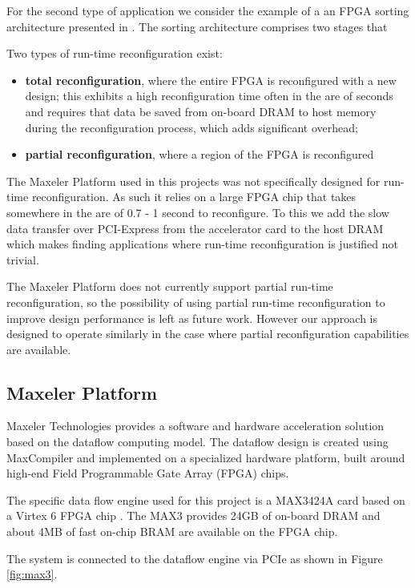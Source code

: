 For the second type of application we consider the example of a an
FPGA sorting architecture presented in \cite{koch2011fpgasort}. The
sorting architecture comprises two stages that

Two types of run-time reconfiguration exist:
\begin{itemize}
\item \textbf{total reconfiguration}, where the entire FPGA is
  reconfigured with a new design; this exhibits a high reconfiguration
  time often in the are of seconds and requires that data be saved
  from on-board DRAM to host memory during the reconfiguration
  process, which adds significant overhead;
\item \textbf{partial reconfiguration}, where a region of the FPGA is
  reconfigured
\end{itemize}

The Maxeler Platform used in this projects was not specifically
designed for run-time reconfiguration. As such it relies on a large
FPGA chip that takes somewhere in the are of 0.7 - 1 second to
reconfigure. To this we add the slow data transfer over PCI-Express
from the accelerator card to the host DRAM which makes finding
applications where run-time reconfiguration is justified not trivial.

The Maxeler Platform does not currently support partial run-time
reconfiguration, so the possibility of using partial run-time
reconfiguration to improve design performance is left as future
work. However our approach is designed to operate similarly in the
case where partial reconfiguration capabilities are available.

\subsection{Maxeler Platform}
\label{sec:maxeler-platform}
Maxeler Technologies provides a software and hardware acceleration
solution based on the dataflow computing model. The dataflow design is
created using MaxCompiler \cite{Maxeler} and implemented on a specialized
hardware platform, built around high-end Field Programmable Gate Array
(FPGA) chips.


The specific data flow engine used for this project is a MAX3424A card
based on a Virtex 6 FPGA chip \cite{Virtex6}. The MAX3 provides 24GB of
on-board DRAM and about 4MB of fast on-chip BRAM are available on the
FPGA chip.

The system is connected to the dataflow engine via PCIe as shown in
Figure \ref{fig:max3}.

